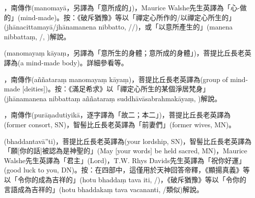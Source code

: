 \startitemgroup[noteitems]
\item{}，南傳作(manomayā，另譯為「意所成的」)，Maurice Walshe先生英譯為「心-做的」(mind-made)。按：《破斥猶豫》等以「禪定心所作的/以禪定心所生的」(jhānacittamayā/jhānamanena nibbatto, //)，或「以意所產生的」(manena nibbattaṃ, /, )解說。
\item{}(manomayaṃ kāyaṃ，另譯為「意所生的身體；意所成的身體」)，菩提比丘長老英譯為(a mind-made body)。詳細參看等。
\item{}，南傳作(aññataraṃ manomayaṃ kāyaṃ)，菩提比丘長老英譯為(group of mind-made [deities])。按：《滿足希求》以「禪定心所生的某個淨居梵身」(jhānamanena nibbattaṃ aññataraṃ suddhāvāsabrahmakāyaṃ, )解說。
\stopitemgroup

\startitemgroup[noteitems]
\item{}，南傳作(purāṇadutiyikā，逐字譯為「故二；本二」)，菩提比丘長老英譯為(former consort, SN)，智髻比丘長老英譯為「前妻們」(former wives, MN)。
\stopitemgroup

\startitemgroup[noteitems]
\item{}(bhaddantavā”ti)，菩提比丘長老英譯為(your lordship, SN)，智髻比丘長老英譯為「願[你的話]被認為是神聖的」(May [your words] be held sacred, MN)，Maurice Walshe先生英譯為「君主」(Lord)，T.W. Rhys Davids先生英譯為「祝你好運」(good luck to you, DN)。按：在四部中，這僅用於天神回答帝釋，《顯揚真義》等以「令你的成為吉祥的」(hotu bhaddaṃ tava iti, /)，《破斥猶豫》等以「令你的言語成為吉祥的」(hotu bhaddakaṃ tava vacananti, /類似)解說。
\stopitemgroup

